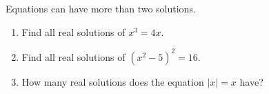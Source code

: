 Equations can have more than two solutions.
\begin{enumerate}
\item[(a)] Find all real solutions of $x^3=4x$.
\item[(b)] Find all real solutions of $\left(x^2-5\right)^2=16$.
\item[(c)] How many real solutions does the equation $|x|=x$ have?
\end{enumerate}
